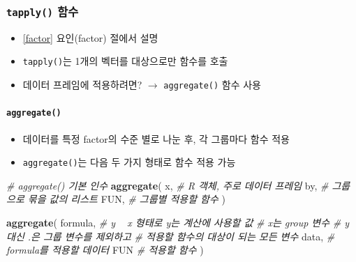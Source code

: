 \documentclass[
  11pt,
]{krantz}
\newenvironment{Shaded}{\begin{snugshade}}{\end{snugshade}}
\newcommand{\CommentTok}[1]{\textcolor[rgb]{0.37,0.37,0.37}{\textit{#1}}}
\newcommand{\KeywordTok}[1]{\textcolor[rgb]{0.27,0.27,0.27}{\textbf{#1}}}
\newcommand{\NormalTok}[1]{#1}
\providecommand{\tightlist}{%
  \setlength{\itemsep}{0pt}\setlength{\parskip}{0pt}}
\begin{document}
\hypertarget{tapply-df}{%
\subsubsection*{\texorpdfstring{\texttt{tapply()} 함수}{tapply() 함수}}\label{tapply-df}}


\begin{itemize}
\tightlist
\item
  \ref{factor} 요인(factor) 절에서 설명
\item
  \texttt{tapply()}는 1개의 벡터를 대상으로만 함수를 호출
\item
  데이터 프레임에 적용하려면? \(\rightarrow\) \texttt{aggregate()} 함수 사용
\end{itemize}

\hypertarget{aggregate}{%
\paragraph{\texorpdfstring{\texttt{aggregate()}}{aggregate()}}\label{aggregate}}

\begin{itemize}
\tightlist
\item
  데이터를 특정 factor의 수준 별로 나눈 후, 각 그룹마다 함수 적용
\item
  \texttt{aggregate()}는 다음 두 가지 형태로 함수 적용 가능
\end{itemize}

\footnotesize

\begin{Shaded}
\begin{Highlighting}[]
\CommentTok{# aggregate() 기본 인수}
\KeywordTok{aggregate}\NormalTok{(}
\NormalTok{  x, }\CommentTok{# R 객체, 주로 데이터 프레임}
\NormalTok{  by, }\CommentTok{# 그룹으로 묶을 값의 리스트}
\NormalTok{  FUN, }\CommentTok{# 그룹별 적용할 함수}
\NormalTok{)}

\KeywordTok{aggregate}\NormalTok{(}
\NormalTok{  formula, }\CommentTok{# y ~ x 형태로 y는 계산에 사용할 값}
           \CommentTok{# x는 group 변수}
           \CommentTok{# y 대신 .은 그룹 변수를 제외하고 }
           \CommentTok{# 적용할 함수의 대상이 되는 모든 변수}
\NormalTok{  data, }\CommentTok{# formula를 적용할 데이터}
\NormalTok{  FUN }\CommentTok{# 적용할 함수}
\NormalTok{)}
\end{Highlighting}
\end{Shaded}

\normalsize
\end{document}
